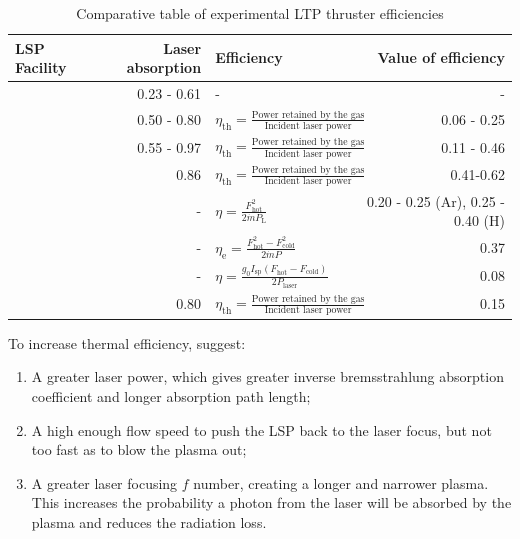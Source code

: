         \begin{table}[!ht]
            \centering
            \caption{Comparative table of experimental LTP thruster efficiencies}
            \label{tab:efficiencies}
            \begin{tabularx}{\textwidth}{@{}>{\small}X<{\raggedright} r l r@{}}
            \toprule
            {\normalsize LSP   Facility}   & Laser absorption  & Efficiency & Value of efficiency \\ \midrule
            \textcite{keeferPowerAbsorptionLasersustained1986a}   & 0.23 - 0.61      &          -        &                 -          \\
            \textcite{krierContinuousWaveLaser1986a}       & 0.50 - 0.80         & $\eta_\mathrm{th} =  \frac{\text{Power retained by the gas}}{\text{Incident laser power}}$ &  0.06 - 0.25 \\
            \textcite{zerkleLasersustainedArgonPlasmas1990}       & 0.55 - 0.97   &         $\eta_\mathrm{th} =  \frac{\text{Power retained by the gas}}{\text{Incident laser power}}$ &  0.11 - 0.46 \\
            \textcite{chenEmissionSpectroscopyCw1989a}          & 0.86                      &  $\eta_\mathrm{th} =  \frac{\text{Power retained by the gas}}{\text{Incident laser power}}$  &  0.41-0.62  \\
            \textcite{blackLaserPropulsion10kW1995}       &  -  & $ \eta = \frac{F_\mathrm{hot}^2}{2 \dot{m} P_\mathrm{L}} $& 0.20 - 0.25 (Ar), 0.25 - 0.40 (H)     \\
            \textcite{toyodaThrustPerformanceCW2002}    & -                      & $ \eta_\mathrm{e} =  \frac{F^2_\mathrm{hot} -F^2_\mathrm{cold}}{2 \dot{m} P} $     &   0.37 \\
            \textcite{takanoDemonstrationDiodeLasersustained}  &       -       & $ \eta = \frac{g_0 I_\mathrm{sp} (F_\mathrm{hot}-F_\mathrm{cold})}{2 P_\mathrm{laser}} $ & 0.08 \\ 
            \textcite{duplayArgonLaserPlasmaThruster2024a}  &  0.80&  $\eta_\mathrm{th} =  \frac{\text{Power retained by the gas}}{\text{Incident laser power}}$ & 0.15 \\
            \bottomrule
            \end{tabularx}
        \end{table}
        

        To increase thermal efficiency, \textcite{chenEmissionSpectroscopyCw1989a} suggest:
        \begin{enumerate}
            \item A greater laser power, which gives greater inverse bremsstrahlung absorption coefficient and longer absorption path length;
            \item A high enough flow speed to push the LSP back to the laser focus, but not too fast as to blow the plasma out;
            \item A greater laser focusing $f$ number, creating a longer and narrower plasma. This increases the probability a photon from the laser will be absorbed by the plasma and reduces the radiation loss.
        \end{enumerate}

